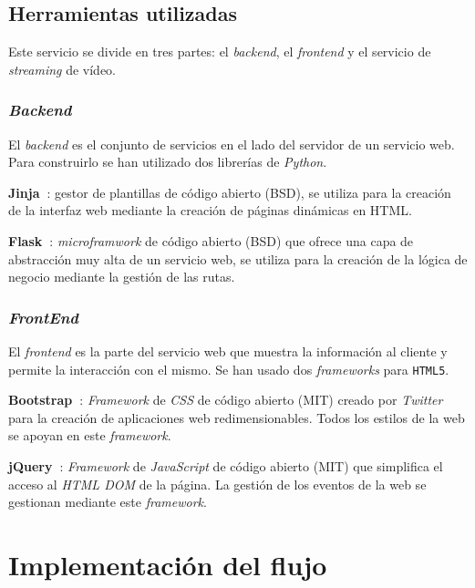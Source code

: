 \subsection{Herramientas utilizadas}\label{sec:recogidadatos}

Este servicio se divide en tres partes: el \textit{backend}, el \textit{frontend} y el servicio de \textit{streaming} de vídeo.

\subsubsection{\textit{Backend}}

El \textit{backend} es el conjunto de servicios en el lado del servidor de un servicio web. Para construirlo se han utilizado dos librerías de \textit{Python}.

\textbf{Jinja~\cite{tool:jinja}}: gestor de plantillas de código abierto (BSD), se utiliza para la creación de la interfaz web mediante la creación de páginas dinámicas en HTML.

\textbf{Flask~\cite{tool:flask}}: \textit{microframwork} de código abierto (BSD) que ofrece una capa de abstracción muy alta de un servicio web, se utiliza para la creación de la lógica de negocio mediante la gestión de las rutas.

\subsubsection{\textit{FrontEnd}}

El \textit{frontend} es la parte del servicio web que muestra la información al cliente y permite la interacción con el mismo. Se han usado dos \textit{frameworks} para \texttt{HTML5}.

\textbf{Bootstrap~\cite{wiki:boostrap}}: \textit{Framework} de \textit{CSS} de código abierto (MIT) creado por \textit{Twitter} para la creación de aplicaciones web redimensionables. Todos los estilos de la web se apoyan en este \textit{framework}.

\textbf{jQuery~\cite{wiki:jquery}}: \textit{Framework} de \textit{JavaScript} de código abierto (MIT) que simplifica el acceso al \textit{HTML DOM} de la página. La gestión de los eventos de la web se gestionan mediante este \textit{framework}.

\section{Implementación del flujo}

